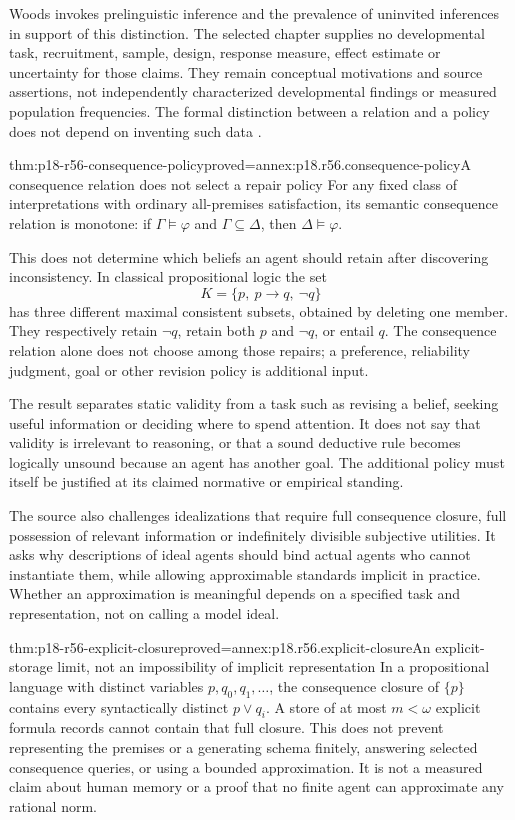 Woods invokes prelinguistic inference and the prevalence of uninvited
inferences in support of this distinction. The selected chapter supplies
no developmental task, recruitment, sample, design, response measure,
effect estimate or uncertainty for those claims. They remain conceptual
motivations and source assertions, not independently characterized
developmental findings or measured population frequencies. The formal
distinction between a relation and a policy does not depend on inventing
such data \cite[p.~368]{Woods2021ReasoningArgumentation}.

\begin{hbtheorem}{thm:p18-r56-consequence-policy}{proved=annex:p18.r56.consequence-policy}{A consequence relation does not select a repair policy}
For any fixed class of interpretations with ordinary all-premises
satisfaction, its semantic consequence relation is monotone:
if \(\Gamma\models\varphi\) and \(\Gamma\subseteq\Delta\),
then \(\Delta\models\varphi\).

This does not determine which beliefs an agent should retain after
discovering inconsistency. In classical propositional logic the set
\[
 K=\{p,\ p\to q,\ \neg q\}
\]
has three different maximal consistent subsets, obtained by deleting
one member. They respectively retain \(\neg q\), retain both \(p\)
and \(\neg q\), or entail \(q\). The consequence relation alone
does not choose among those repairs; a preference, reliability judgment,
goal or other revision policy is additional input.
\end{hbtheorem}

The result separates static validity from a task such as revising a belief,
seeking useful information or deciding where to spend attention. It does
not say that validity is irrelevant to reasoning, or that a sound
deductive rule becomes logically unsound because an agent has another
goal. The additional policy must itself be justified at its claimed
normative or empirical standing.

The source also challenges idealizations that require full consequence
closure, full possession of relevant information or indefinitely divisible
subjective utilities. It asks why descriptions of ideal agents should
bind actual agents who cannot instantiate them, while allowing
approximable standards implicit in practice. Whether an approximation
is meaningful depends on a specified task and representation, not on
calling a model ideal.

\begin{hbtheorem}{thm:p18-r56-explicit-closure}{proved=annex:p18.r56.explicit-closure}{An explicit-storage limit, not an impossibility of implicit representation}
In a propositional language with distinct variables
\(p,q_0,q_1,\ldots\), the consequence closure of \(\{p\}\)
contains every syntactically distinct \(p\lor q_i\).
A store of at most \(m<\omega\) explicit formula records cannot
contain that full closure.
This does not prevent representing the premises or a generating
schema finitely, answering selected consequence queries, or using
a bounded approximation. It is not a measured claim about human
memory or a proof that no finite agent can approximate any rational norm.
\end{hbtheorem}

